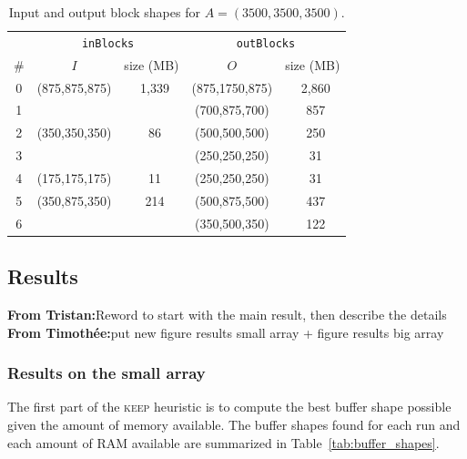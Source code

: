 \documentclass[sigconf, nonacm]{acmart}
\newcommand{\tristan}[1]{\color{orange}\textbf{From Tristan:}#1\color{black}}
\newcommand{\timothee}[1]{\color{blue}\textbf{From Timothée:}#1\color{black}}
\newcommand{\keep}[0]{\textsc{keep}\xspace}
\begin{document}
\begin{table}[ht]
  \centering
  \caption{Input and output block shapes for $A=(3500,3500,3500)$.}
   \begin{tabular}{c|cc|cc}
   \rowcolor{black!25}
          & \multicolumn{2}{c|}{\texttt{inBlocks}} & \multicolumn{2}{c}{\texttt{outBlocks}} \\
    \rowcolor{black!25}
     \#     & $I$ & size (MB) & $O$ & size (MB)  \\
   \hline
   0 & (875,875,875) & ~1,339 & (875,1750,875) & ~2,860 \\
   1 &               &     & (700,875,700)  & ~857 \\
   \rowcolor{black!10}
   2 & (350,350,350) & ~86  & (500,500,500)  & ~250 \\
   \rowcolor{black!10}
   3 &               &     & (250,250,250)  & ~31  \\
   4 & (175,175,175) &  ~11  & (250,250,250)  & ~31 \\
   \rowcolor{black!10}
   5 & (350,875,350) & ~214 & (500,875,500)  & ~437 \\
   \rowcolor{black!10}
   6 &               &     & (350,500,350)  & ~122 \\
   \end{tabular}
   \label{tab:exp}
\end{table}

\subsection{Results}
\tristan{Reword to start with the main result, then describe the details}
\timothee{put new figure results small array + figure results big array}

\subsubsection{Results on the small array}

The first part of the \keep heuristic is to compute the best buffer shape possible
given the amount of memory available.
The buffer shapes found for each run and each amount of RAM available are summarized in
Table~\ref{tab:buffer_shapes}.
\end{document}
